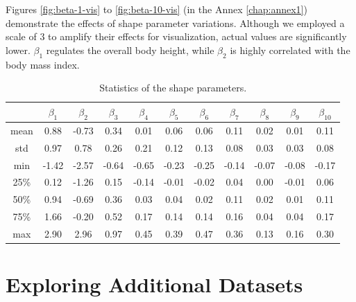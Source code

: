 Figures \ref{fig:beta-1-vis} to \ref{fig:beta-10-vis} (in the Annex
\ref{chap:annex1}) demonstrate the effects of shape parameter variations.
Although we employed a scale of 3 to amplify their effects for visualization,
actual values are significantly lower. $\beta_1$ regulates the overall body
height, while $\beta_2$ is highly correlated with the body mass index.

\begin{table}[h]
	\centering
	\begin{tabular}{c | c c c c c c c c c c}
		\toprule
		     & $\beta_1$ & $\beta_2$ & $\beta_3$ & $\beta_4$ & $\beta_5$ & $\beta_6$ & $\beta_7$ & $\beta_8$ & $\beta_9$ & $\beta_{10}$ \\
		\midrule
		mean & 0.88      & -0.73     & 0.34      & 0.01      & 0.06      & 0.06      & 0.11      & 0.02      & 0.01      & 0.11         \\

		std  & 0.97      & 0.78      & 0.26      & 0.21      & 0.12      & 0.13      & 0.08      & 0.03      & 0.03      & 0.08         \\

		min  & -1.42     & -2.57     & -0.64     & -0.65     & -0.23     & -0.25     & -0.14     & -0.07     & -0.08     &
		-0.17                                                                                                                           \\

		25\% & 0.12      & -1.26     & 0.15      & -0.14     & -0.01     & -0.02     & 0.04      & 0.00      & -0.01     & 0.06         \\

		50\% & 0.94      & -0.69     & 0.36      & 0.03      & 0.04      & 0.02      & 0.11      & 0.02      & 0.01      & 0.11         \\

		75\% & 1.66      & -0.20     & 0.52      & 0.17      & 0.14      & 0.14      & 0.16      & 0.04      & 0.04      & 0.17         \\

		max  & 2.90      & 2.96      & 0.97      & 0.45      & 0.39      & 0.47      & 0.36      & 0.13      & 0.16      & 0.30         \\
		\bottomrule
	\end{tabular}
	\caption{Statistics of the shape parameters.}
\end{table}

\section{Exploring Additional Datasets}

